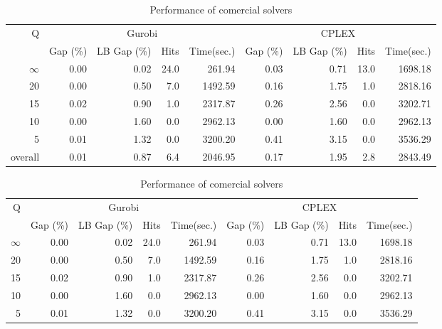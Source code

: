 \begin{table}[H]
\centering
\caption{Performance of comercial solvers}
\label{tab:solvers_resuts}
\begin{tabular}{r rrrr rrrr}
\toprule
       Q & \multicolumn{4}{c}{Gurobi} & \multicolumn{4}{c}{CPLEX} \\
         & Gap (\%) & LB Gap (\%) & Hits & Time(sec.) & Gap (\%) & LB Gap (\%) & Hits & Time(sec.) \\
\midrule
$\infty$ &     0.00 &        0.02 & 24.0 &     261.94 &     0.03 &        0.71 & 13.0 &    1698.18 \\
      20 &     0.00 &        0.50 &  7.0 &    1492.59 &     0.16 &        1.75 &  1.0 &    2818.16 \\
      15 &     0.02 &        0.90 &  1.0 &    2317.87 &     0.26 &        2.56 &  0.0 &    3202.71 \\
      10 &     0.00 &        1.60 &  0.0 &    2962.13 &     0.00 &        1.60 &  0.0 &    2962.13 \\
       5 &     0.01 &        1.32 &  0.0 &    3200.20 &     0.41 &        3.15 &  0.0 &    3536.29 \\
\midrule
 overall &     0.01 &        0.87 &  6.4 &    2046.95 &     0.17 &        1.95 &  2.8 &    2843.49 \\
\bottomrule
\end{tabular}
\end{table}\begin{table}[H]
\centering
\caption{Performance of comercial solvers}
\label{tab:solvers_results}
\begin{tabular}{r rrrr rrrr}
\toprule
       Q & \multicolumn{4}{c}{Gurobi} & \multicolumn{4}{c}{CPLEX} \\
         & Gap (\%) & LB Gap (\%) & Hits & Time(sec.) & Gap (\%) & LB Gap (\%) & Hits & Time(sec.) \\
\midrule
$\infty$ &     0.00 &        0.02 & 24.0 &     261.94 &     0.03 &        0.71 & 13.0 &    1698.18 \\
      20 &     0.00 &        0.50 &  7.0 &    1492.59 &     0.16 &        1.75 &  1.0 &    2818.16 \\
      15 &     0.02 &        0.90 &  1.0 &    2317.87 &     0.26 &        2.56 &  0.0 &    3202.71 \\
      10 &     0.00 &        1.60 &  0.0 &    2962.13 &     0.00 &        1.60 &  0.0 &    2962.13 \\
       5 &     0.01 &        1.32 &  0.0 &    3200.20 &     0.41 &        3.15 &  0.0 &    3536.29 \\

\end{tabular}
\end{table}
